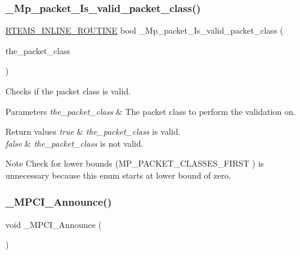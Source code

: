 \subsubsection{\texorpdfstring{\_Mp\_packet\_Is\_valid\_packet\_class()}{\_Mp\_packet\_Is\_valid\_packet\_class()}}
{\footnotesize\ttfamily \mbox{\hyperlink{group__RTEMSScoreBaseDefs_gac216239df231d5dbd15e3520b0b9313f}{R\+T\+E\+M\+S\+\_\+\+I\+N\+L\+I\+N\+E\+\_\+\+R\+O\+U\+T\+I\+NE}} bool \+\_\+\+Mp\+\_\+packet\+\_\+\+Is\+\_\+valid\+\_\+packet\+\_\+class (\begin{DoxyParamCaption}\item[{\mbox{\hyperlink{group__RTEMSScoreMPPacket_gafed9717210f8917e5acb8e63f2c6bac3}{M\+P\+\_\+packet\+\_\+\+Classes}}}]{the\+\_\+packet\+\_\+class }\end{DoxyParamCaption})}



Checks if the packet class is valid. 


\begin{DoxyParams}{Parameters}
{\em the\+\_\+packet\+\_\+class} & The packet class to perform the validation on.\\
\hline
\end{DoxyParams}

\begin{DoxyRetVals}{Return values}
{\em true} & {\itshape the\+\_\+packet\+\_\+class} is valid. \\
\hline
{\em false} & {\itshape the\+\_\+packet\+\_\+class} is not valid.\\
\hline
\end{DoxyRetVals}
\begin{DoxyNote}{Note}
Check for lower bounds (M\+P\+\_\+\+P\+A\+C\+K\+E\+T\+\_\+\+C\+L\+A\+S\+S\+E\+S\+\_\+\+F\+I\+R\+ST ) is unnecessary because this enum starts at lower bound of zero. 
\end{DoxyNote}
\mbox{\label{group__RTEMSScoreMPCI_gaafbd7ed1ef4bd2b8672df8da832f79f4}} 
\subsubsection{\texorpdfstring{\_MPCI\_Announce()}{\_MPCI\_Announce()}}
{\footnotesize\ttfamily void \+\_\+\+M\+P\+C\+I\+\_\+\+Announce (\begin{DoxyParamCaption}\item[{void}]{ }\end{DoxyParamCaption})}



